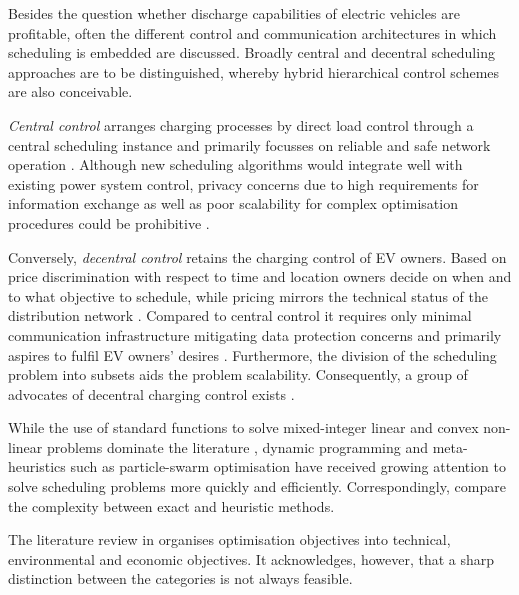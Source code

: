 Besides the question whether discharge capabilities of electric vehicles are profitable, often the different control and communication architectures in which scheduling is embedded are discussed. Broadly central and decentral scheduling approaches are to be distinguished, whereby hybrid hierarchical control schemes are also conceivable. 

\textit{Central control} arranges charging processes by direct load control through a central scheduling instance and primarily focusses on reliable and safe network operation \cite{Vaya2012, Schuller2013}. Although new scheduling algorithms would integrate well with existing power system control, privacy concerns due to high requirements for information exchange as well as poor scalability for complex optimisation procedures could be prohibitive \cite{Li2005, OConnell2014}. 

Conversely, \textit{decentral control} retains the charging control of EV owners. Based on price discrimination with respect to time and location owners decide on when and to what objective to schedule, while pricing mirrors the technical status of the distribution network \cite{Rajakaruna2015}. Compared to central control it requires only minimal communication infrastructure mitigating data protection concerns and primarily aspires to fulfil EV owners' desires \cite{OConnell2014}. Furthermore, the division of the scheduling problem into subsets aids the problem scalability. Consequently, a group of advocates of decentral charging control exists \cite{He2012, Contreras-Ocana2016, Xing2015, Gan2013}.

While the use of standard functions to solve mixed-integer linear and convex non-linear problems dominate the literature \cite{Wu2012,Akhavan-Rezai2016}, dynamic programming \cite{Han2010, Rotering2011} and meta-heuristics such as particle-swarm optimisation \cite{Hai-Ying2011, Arias2017, Peppanen2014, Soares2013,Celli2012, Wen2016} have received growing attention to solve scheduling problems more quickly and efficiently. Correspondingly, \cite{Sassi2016} compare the complexity between exact and heuristic methods.


The literature review in \cite{Rajakaruna2015} organises optimisation objectives into technical, environmental and economic objectives. It acknowledges, however, that a sharp distinction between the categories is not always feasible.

